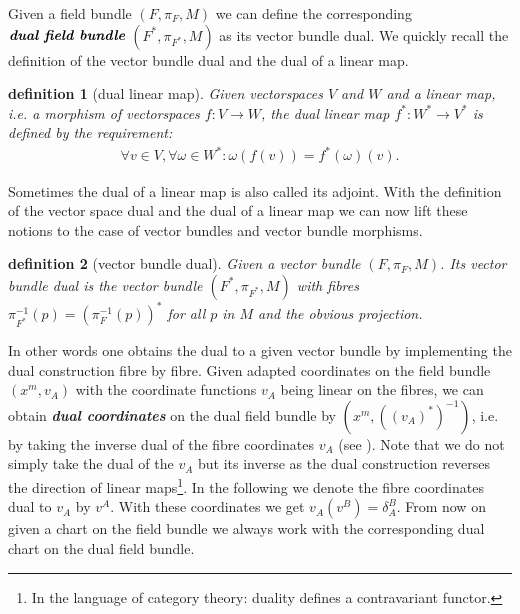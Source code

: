 \documentclass[a4paper,12pt, DIV=14, BCOR=5mm, twoside, headsepline]{scrbook}
\newtheorem{definition}{definition}[section]
\begin{document}
Given a field bundle $(F, \pi_F, M)$ we can define the corresponding $\textit{\textbf{dual field bundle}}$ $(F^{\ast}, \pi_{F^{\ast}},M)$ as its vector bundle dual. We quickly recall the definition of the vector bundle dual and the dual of a linear map.
\begin{definition}[dual linear map] \label{dual}
Given vectorspaces $V$ and $W$ and a linear map, i.e. a morphism of vectorspaces $f : V \rightarrow W$, the dual linear map $f^{\ast} : W^{\ast} \rightarrow V^{\ast}$ is defined by the requirement: 
\begin{align}
    \forall v \in V, \forall \omega \in W^{\ast} : \omega (f(v)) = f^{\ast}(\omega) (v).
\end{align}
\end{definition}
Sometimes the dual of a linear map is also called its adjoint. With the definition of the vector space dual and the dual of a linear map we can now lift these notions to the case of vector bundles and vector bundle morphisms.
\begin{definition} [vector bundle dual]
Given a vector bundle $(F, \pi_F,M)$. Its vector bundle dual is the vector bundle $(F^{\ast}, \pi_{F^{\ast}},M)$ with fibres $\pi_{F^{\ast}}^{-1}(p) = (\pi_F^{-1}(p))^{\ast} $ for all $p$ in $M$ and the obvious projection.  
\end{definition}
In other words one obtains the dual to a given vector bundle by implementing the dual construction fibre by fibre.
Given adapted coordinates on the field bundle $(x^m, v_A)$ with the coordinate functions $v_A$ being linear on the fibres, we can obtain \textbf{\textit{dual coordinates}} on the dual field bundle by $(x^m, ((v_A)^{\ast})^{-1})$, i.e. by taking the inverse dual of the fibre coordinates $v_A$ (see \cite{saunders_1989}). Note that we do not simply take the dual of the $v_A$ but its inverse as the dual construction reverses the direction of linear maps\footnote{In the language of category theory: duality defines a contravariant functor.}. In the following we denote the fibre coordinates dual to $v_A$ by $v^A$. With these coordinates we get $ v_A(v^B) = \delta_A^B$. From now on given a chart on the field bundle we always work with the corresponding dual chart on the dual field bundle.\\
\end{document}
